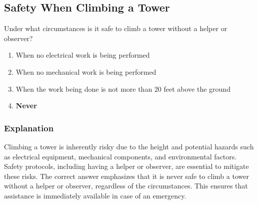 \subsection{Safety When Climbing a Tower}\label{T0B03}

\begin{tcolorbox}[colback=gray!10!white,colframe=black!75!black,title=T0B03]
Under what circumstances is it safe to climb a tower without a helper or observer?
\begin{enumerate}[noitemsep]
    \item When no electrical work is being performed
    \item When no mechanical work is being performed
    \item When the work being done is not more than 20 feet above the ground
    \item \textbf{Never}
\end{enumerate}
\end{tcolorbox}

\subsubsection*{Explanation}
Climbing a tower is inherently risky due to the height and potential hazards such as electrical equipment, mechanical components, and environmental factors. Safety protocols, including having a helper or observer, are essential to mitigate these risks. The correct answer emphasizes that it is never safe to climb a tower without a helper or observer, regardless of the circumstances. This ensures that assistance is immediately available in case of an emergency.